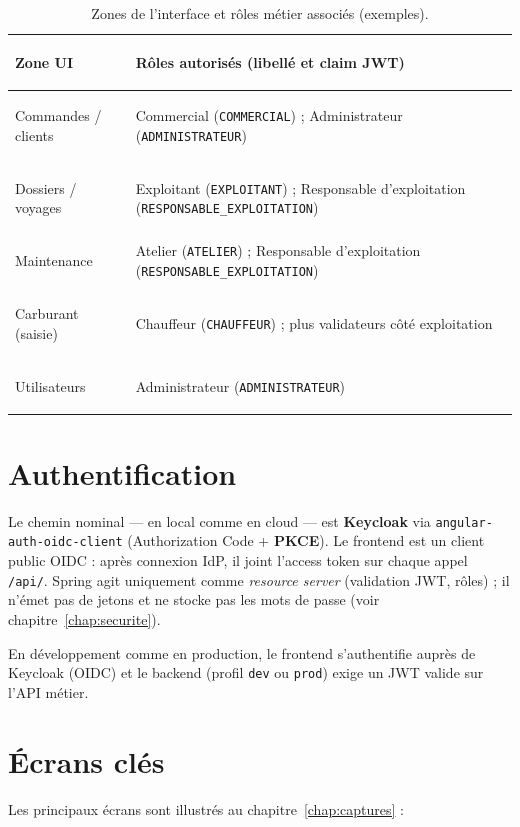 \begin{table}[H]
\centering
\caption{Zones de l'interface et rôles métier associés (exemples).}
\label{tab:rbac-ui}
\small
\begin{tabularx}{\linewidth}{@{}>{\bfseries\raggedright\arraybackslash}p{3.4cm} >{\raggedright\arraybackslash}X@{}}
\toprule
Zone UI & Rôles autorisés (libellé et claim JWT) \\
\midrule
Commandes / clients &
  Commercial (\texttt{COMMERCIAL}) ;\quad
  Administrateur (\texttt{ADMINISTRATEUR}) \\[0.65em]
Dossiers / voyages &
  Exploitant (\texttt{EXPLOITANT}) ;\quad
  Responsable d'exploitation (\texttt{RESPONSABLE\_EXPLOITATION}) \\[0.65em]
Maintenance &
  Atelier (\texttt{ATELIER}) ;\quad
  Responsable d'exploitation (\texttt{RESPONSABLE\_EXPLOITATION}) \\[0.65em]
Carburant (saisie) &
  Chauffeur (\texttt{CHAUFFEUR}) ;\quad
  plus validateurs côté exploitation \\[0.65em]
Utilisateurs &
  Administrateur (\texttt{ADMINISTRATEUR}) \\
\bottomrule
\end{tabularx}
\end{table}

\section{Authentification}

Le chemin nominal --- en local comme en cloud --- est \textbf{Keycloak} via
\texttt{angular-auth-oidc-client} (Authorization Code + \textbf{PKCE}). Le frontend est un
client public OIDC : après connexion IdP, il joint l'access token sur chaque appel
\texttt{/api/}. Spring agit uniquement comme \emph{resource server} (validation JWT, rôles) ;
il n'émet pas de jetons et ne stocke pas les mots de passe
(voir chapitre~\ref{chap:securite}).

En développement comme en production, le frontend s'authentifie auprès de Keycloak
(OIDC) et le backend (profil \texttt{dev} ou \texttt{prod}) exige un JWT valide sur
l'API métier.

\section{Écrans clés}

Les principaux écrans sont illustrés au chapitre~\ref{chap:captures} :

